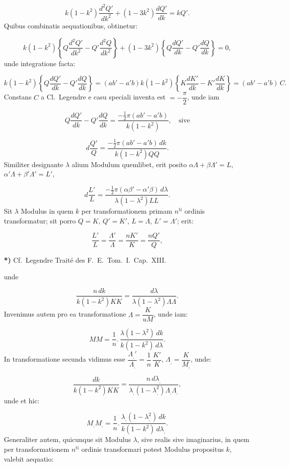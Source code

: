 \documentclass{article}
\begin{document}
\[
k(1-k^{2})\frac{d^{2}Q'}{dk^{2}}+(1-3k^{2})\frac{dQ'}{dk}=kQ'.
\]
Quibus combinatis aequationibus, obtinetur:

\[
k(1-k^{2})\left\{Q\frac{d^{2}Q'}{dk^{2}}-Q'\frac{d^{2}Q}{dk^{2}}\right\}+(1-3k^{2})\left\{Q\frac{dQ'}{dk}-Q'\frac{dQ}{dk}\right\}=0,
\]
unde integratione facta:

\[
k(1-k^{2})\left\{Q\frac{dQ'}{dk}-Q'\frac{dQ}{dk}\right\}=(ab'-a'b)k(1-k^{2})\left\{K\frac{dK'}{dk}-K'\frac{dK}{dk}\right\}=(ab'-a'b)\,C.
\]
Constans $C$ a Cl.\ Legendre e casu speciali inventa est $=-\dfrac{\pi}{2}$, unde iam

\[
Q\frac{dQ'}{dk}-Q'\frac{dQ}{dk}=\frac{-\frac{1}{2}\pi(ab'-a'b)}{k(1-k^{2})},\quad\text{sive}
\]

\[
d\frac{Q'}{Q}=\frac{-\frac{1}{2}\pi(ab'-a'b)\,dk}{k(1-k^{2})QQ}.
\]
Similiter designante $\lambda$ alium Modulum quemlibet, erit posito $\alpha\Lambda+\beta\Lambda'=L$, $\alpha'\Lambda+\beta'\Lambda'=L'$,

\[
d\frac{L'}{L}=\frac{-\frac{1}{2}\pi(\alpha\beta'-\alpha'\beta)\,d\lambda}{\lambda(1-\lambda^{2})LL}.
\]
Sit $\lambda$ Modulus in quem $k$ per transformationem primam $n^{\mathrm{ti}}$ ordinis transformatur; sit porro $Q=K$, $Q'=K'$, $L=\Lambda$, $L'=\Lambda'$; erit:

\[
\frac{L'}{L}=\frac{\Lambda'}{\Lambda}=\frac{nK'}{K}=\frac{nQ'}{Q},
\]

\textbf{*)} Cf.\ Legendre Traité des F.\ E.\ Tom.\ I.\ Cap.\ XIII.


unde

\[
\frac{n\,dk}{k(1-k^{2})KK}=\frac{d\lambda}{\lambda(1-\lambda^{2})\Lambda\Lambda}.
\]
Invenimus autem pro ea transformatione $\Lambda=\dfrac{K}{uM}$, unde iam:

\[
MM=\frac{1}{n}.\,\frac{\lambda(1-\lambda^{2})\,dk}{k(1-k^{2})\,d\lambda}.
\]
In transformatione secunda vidimus esse $\dfrac{\Lambda_{,}'}{\Lambda_{,}}=\dfrac{1}{n}\,\dfrac{K'}{K}$, $\Lambda_{,}=\dfrac{K}{M_{,}}$, unde:

\[
\frac{dk}{k(1-k^{2})KK}=\frac{n\,d\lambda_{,}}{\lambda_{,}(1-\lambda_{,}^{2})\Lambda_{,}\Lambda_{,}},
\]
unde et hic:

\[
M_{,}M_{,}=\frac{1}{n}.\,\frac{\lambda_{,}(1-\lambda_{,}^{2})\,dk}{k(1-k^{2})\,d\lambda_{,}}.
\]
Generaliter autem, quicunque sit Modulus $\lambda$, sive realis sive imaginarius, in quem per transformationem $n^{\mathrm{ti}}$ ordinis transformari potest Modulus propositus $k$, valebit aequatio:
\end{document}
